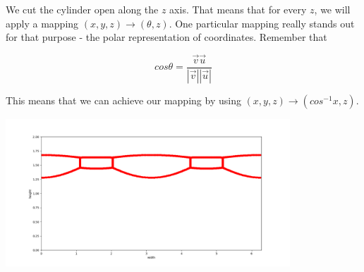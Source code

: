 We cut the cylinder open along the $z$ axis. That means that for every $z$, we will apply a mapping $(x,y,z) \to (\theta, z)$. One particular mapping really stands out for that purpose - the polar representation of coordinates. Remember that 

$$ cos \theta = \frac{\vec{v}\vec{u}}{|\vec{v}||\vec{u}|}$$

This means that we can achieve our mapping by using $(x,y,z) \to (cos^{-1}x, z)$.


\includegraphics[width=0.8\textwidth]{images/room.png}

